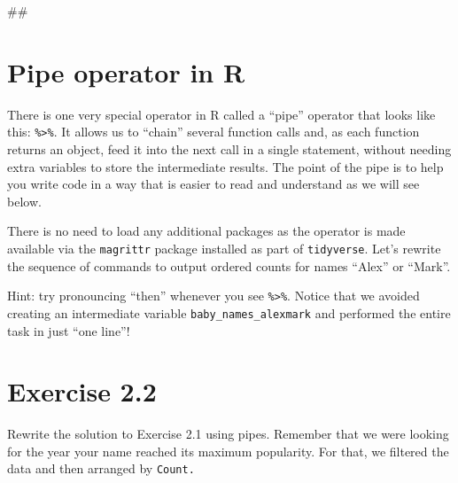 \documentclass[]{book}
\newenvironment{Shaded}{\begin{snugshade}}{\end{snugshade}}
\newcommand{\KeywordTok}[1]{\textcolor[rgb]{0.13,0.29,0.53}{\textbf{#1}}}
\newcommand{\DecValTok}[1]{\textcolor[rgb]{0.00,0.00,0.81}{#1}}
\newcommand{\StringTok}[1]{\textcolor[rgb]{0.31,0.60,0.02}{#1}}
\newcommand{\OperatorTok}[1]{\textcolor[rgb]{0.81,0.36,0.00}{\textbf{#1}}}
\newcommand{\NormalTok}[1]{#1}
\begin{document}
\begin{Shaded}
\begin{Highlighting}[]
\NormalTok{##}
\end{Highlighting}
\end{Shaded}

\section{Pipe operator in R}\label{pipe-operator-in-r}

There is one very special operator in R called a ``pipe'' operator that
looks like this: \texttt{\%\textgreater{}\%}. It allows us to ``chain''
several function calls and, as each function returns an object, feed it
into the next call in a single statement, without needing extra
variables to store the intermediate results. The point of the pipe is to
help you write code in a way that is easier to read and understand as we
will see below.

There is no need to load any additional packages as the operator is made
available via the \texttt{magrittr} package installed as part of
\texttt{tidyverse}. Let's rewrite the sequence of commands to output
ordered counts for names ``Alex'' or ``Mark''.

\begin{Shaded}
\end{Shaded}

Hint: try pronouncing ``then'' whenever you see
\texttt{\%\textgreater{}\%}. Notice that we avoided creating an
intermediate variable \texttt{baby\_names\_alexmark} and performed the
entire task in just ``one line''!

\section{Exercise 2.2}\label{exercise-2.2}

Rewrite the solution to Exercise 2.1 using pipes. Remember that we were
looking for the year your name reached its maximum popularity. For that,
we filtered the data and then arranged by \texttt{Count.}
\end{document}
